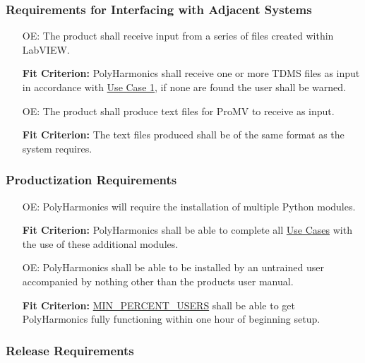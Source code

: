 \documentclass[12pt]{article}
\newcounter{oaenum}
\newcommand{\progname}{PolyHarmonics}
\begin{document}
\subsubsection{Requirements for Interfacing with Adjacent Systems}

\noindent \begin{itemize}
\item[OE\refstepcounter{oaenum}\theoaenum\label{NF_AS1}:] The product shall
  receive input from a series of files created within LabVIEW.

  \textbf{Fit Criterion:} \progname{} shall receive one or more TDMS files as 
input in accordance with \hyperref[UseCase]{Use Case 1}, if none are found
 the user shall be warned.

\item[OE\refstepcounter{oaenum}\theoaenum\label{NF_AS2}:] The product shall
  produce text files for ProMV to receive as input.

  \textbf{Fit Criterion:} The text files produced shall be of the same format as 
the system requires.
\end{itemize}


\subsubsection{Productization Requirements}

\noindent \begin{itemize}
\item[OE\refstepcounter{oaenum}\theoaenum\label{NF_PR1}:] \progname{} will
  require the installation of multiple Python modules.

  \textbf{Fit Criterion:} \progname{} shall be able to complete all
\hyperref[UseCase]{Use Cases} with the use of these additional modules.


\item[OE\refstepcounter{oaenum}\theoaenum\label{NF_PR2}:] \progname{} shall be
  able to be installed by an untrained user accompanied by nothing other than
  the products user manual.

  \textbf{Fit Criterion:} \hyperref[AppendA]{MIN\_PERCENT\_USERS} shall be able
  to get \progname{} fully functioning within one hour of beginning setup.
\end{itemize}

\subsubsection{Release Requirements}
\end{document}

